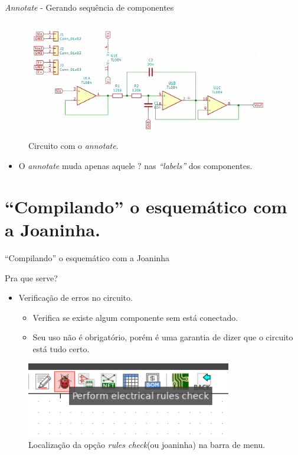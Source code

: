 \documentclass{beamer}
\begin{document}
\begin{frame}{\textit{Annotate} - Gerando sequência de componentes}
	\begin{figure}
		\centering
		\includegraphics[width=0.95\textwidth]{Imagens/07_circ_com_anotate.png}
		\caption{Circuito com o \textit{annotate}.}
	\end{figure}
	\pause
	\begin{itemize}
		\item O \textit{annotate} muda apenas aquele $?$ nas \textit{``labels''} dos componentes.
	\end{itemize}
\end{frame}

\section{``Compilando'' o esquemático com a Joaninha.}
\begin{frame}{``Compilando'' o esquemático com a Joaninha}
	\begin{block}{Pra que serve?}
		\begin{itemize}
			\item Verificação de erros no circuito.
			\begin{itemize}
				\item Verifica se existe algum componente sem está conectado.
				\item Seu uso não é obrigatório, porém é uma garantia de dizer que o circuito está tudo certo.
			\end{itemize}
		\end{itemize}
	\end{block}
	\begin{figure}
		\centering
		\includegraphics[width=0.8\textwidth]{Imagens/08_joaninha.png}
		\caption{Localização da opção \textit{rules check}(ou joaninha) na barra de menu.}
	\end{figure}
\end{frame}
\end{document}
